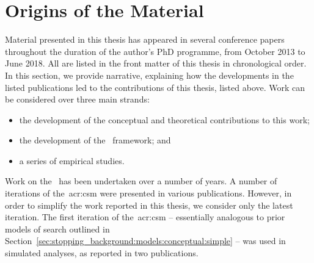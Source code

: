 
\section{Origins of the Material}\label{sec:intro:origins}
Material presented in this thesis has appeared in several conference papers throughout the duration of the author's PhD programme, from October 2013 to June 2018. All are listed in the front matter of this thesis in chronological order. In this section, we provide narrative, explaining how the developments in the listed publications led to the contributions of this thesis, listed above. Work can be considered over three main strands:

\begin{itemize}
    \item{the development of the conceptual and theoretical contributions to this work;}
    \item{the development of the \simiir~framework; and}
    \item{a series of empirical studies.}
\end{itemize}

\noindent
{}
Work on the~ has been undertaken over a number of years. A number of iterations of the~\gls{acr:csm} were presented in various publications. However, in order to simplify the work reported in this thesis, we consider only the latest iteration. The first iteration of the~\gls{acr:csm} -- essentially analogous to prior models of search outlined in Section~\ref{sec:stopping_background:models:conceptual:simple} -- was used in simulated analyses, as reported in two publications.

